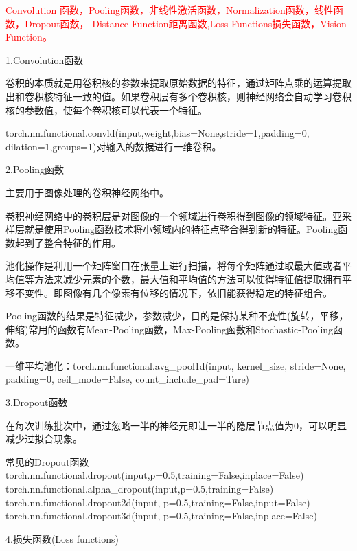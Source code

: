 \documentclass[openbib]{article}
\begin{document}
\textcolor{red}{Convolution 函数，Pooling函数，非线性激活函数，Normalization函数，线性函数，Dropout函数， Distance Function距离函数,Loss Functions损失函数，Vision Function。}

\begin{center}
	1.Convolution函数
\end{center}

卷积的本质就是用卷积核的参数来提取原始数据的特征，通过矩阵点乘的运算提取出和卷积核特征一致的值。如果卷积层有多个卷积核，则神经网络会自动学习卷积核的参数值，使每个卷积核可以代表一个特征。

torch.nn.functional.convld(input,weight,bias=None,stride=1,padding=0,\\dilation=1,groups=1)对输入的数据进行一维卷积。

\begin{center}
	2.Pooling函数
\end{center}
主要用于图像处理的卷积神经网络中。

卷积神经网络中的卷积层是对图像的一个领域进行卷积得到图像的领域特征。亚采样层就是使用Pooling函数技术将小领域内的特征点整合得到新的特征。Pooling函数起到了整合特征的作用。

池化操作是利用一个矩阵窗口在张量上进行扫描，将每个矩阵通过取最大值或者平均值等方法来减少元素的个数，最大值和平均值的方法可以使得特征值提取拥有平移不变性。即图像有几个像素有位移的情况下，依旧能获得稳定的特征组合。

Pooling函数的结果是特征减少，参数减少，目的是保持某种不变性(旋转，平移，伸缩)常用的函数有Mean-Pooling函数，Max-Pooling函数和Stochastic-Pooling函数。

一维平均池化：torch.nn.functional.avg\_pool1d(input, kernel\_size, stride=None, padding=0, ceil\_mode=False, count\_include\_pad=Ture)

\begin{center}
	3.Dropout函数
\end{center}

在每次训练批次中，通过忽略一半的神经元即让一半的隐层节点值为0，可以明显减少过拟合现象。

\begin{Python}{常见的Dropout函数}
	torch.nn.functional.dropout(input,p=0.5,training=False,inplace=False)
	torch.nn.functional.alpha\_dropout(input,p=0.5,training=False)
	torch.nn.functional.dropout2d(input, p=0.5,training=False,input=False)
	torch.nn.functional.dropout3d(input, p=0.5,training=False,inplace=False)
\end{Python}
\begin{center}
	4.损失函数(Loss functions)
\end{center}
\end{document}
